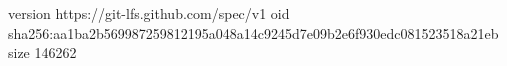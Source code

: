 version https://git-lfs.github.com/spec/v1
oid sha256:aa1ba2b569987259812195a048a14c9245d7e09b2e6f930edc081523518a21eb
size 146262

